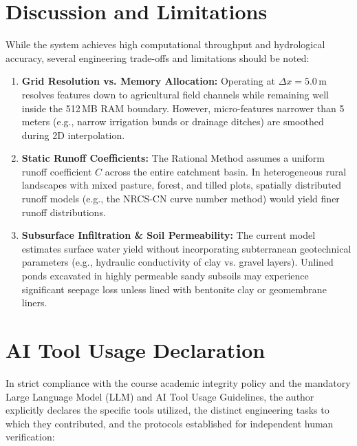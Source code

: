 \documentclass[manuscript,screen,review]{acmart}
\begin{document}
\section{Discussion and Limitations}
\label{sec:discussion}
While the system achieves high computational throughput and hydrological accuracy, several engineering trade-offs and limitations should be noted:
\begin{enumerate}
    \item \textbf{Grid Resolution vs. Memory Allocation:} Operating at $\Delta x = 5.0$\,m resolves features down to agricultural field channels while remaining well inside the 512\,MB RAM boundary. However, micro-features narrower than 5 meters (e.g., narrow irrigation bunds or drainage ditches) are smoothed during 2D interpolation.
    \item \textbf{Static Runoff Coefficients:} The Rational Method assumes a uniform runoff coefficient $C$ across the entire catchment basin. In heterogeneous rural landscapes with mixed pasture, forest, and tilled plots, spatially distributed runoff models (e.g., the NRCS-CN curve number method) would yield finer runoff distributions.
    \item \textbf{Subsurface Infiltration \& Soil Permeability:} The current model estimates surface water yield without incorporating subterranean geotechnical parameters (e.g., hydraulic conductivity of clay vs. gravel layers). Unlined ponds excavated in highly permeable sandy subsoils may experience significant seepage loss unless lined with bentonite clay or geomembrane liners.
\end{enumerate}

\section{AI Tool Usage Declaration}
\label{sec:ai-usage}

In strict compliance with the course academic integrity policy and the mandatory Large Language Model (LLM) and AI Tool Usage Guidelines, the author explicitly declares the specific tools utilized, the distinct engineering tasks to which they contributed, and the protocols established for independent human verification:
\end{document}
